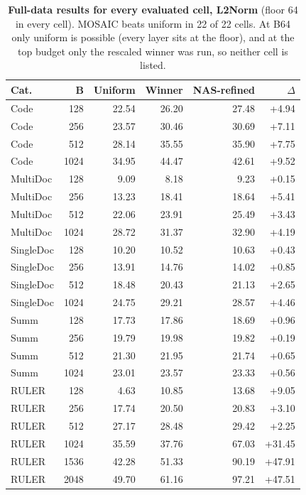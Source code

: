 \begin{table}[t]
  \centering
  \scriptsize
  \setlength{\tabcolsep}{3pt}
  \begin{tabular}{@{}l r r r r r@{}}
    \toprule
    Cat. & B & Uniform & Winner & NAS-refined & $\Delta$ \\
    \midrule
    Code & 128 & 22.54 & 26.20 & 27.48 & +4.94 \\
    Code & 256 & 23.57 & 30.46 & 30.69 & +7.11 \\
    Code & 512 & 28.14 & 35.55 & 35.90 & +7.75 \\
    Code & 1024 & 34.95 & 44.47 & 42.61 & +9.52 \\
    MultiDoc & 128 & 9.09 & 8.18 & 9.23 & +0.15 \\
    MultiDoc & 256 & 13.23 & 18.41 & 18.64 & +5.41 \\
    MultiDoc & 512 & 22.06 & 23.91 & 25.49 & +3.43 \\
    MultiDoc & 1024 & 28.72 & 31.37 & 32.90 & +4.19 \\
    SingleDoc & 128 & 10.20 & 10.52 & 10.63 & +0.43 \\
    SingleDoc & 256 & 13.91 & 14.76 & 14.02 & +0.85 \\
    SingleDoc & 512 & 18.48 & 20.43 & 21.13 & +2.65 \\
    SingleDoc & 1024 & 24.75 & 29.21 & 28.57 & +4.46 \\
    Summ & 128 & 17.73 & 17.86 & 18.69 & +0.96 \\
    Summ & 256 & 19.79 & 19.98 & 19.82 & +0.19 \\
    Summ & 512 & 21.30 & 21.95 & 21.74 & +0.65 \\
    Summ & 1024 & 23.01 & 23.57 & 23.33 & +0.56 \\
    RULER & 128 & 4.63 & 10.85 & 13.68 & +9.05 \\
    RULER & 256 & 17.74 & 20.50 & 20.83 & +3.10 \\
    RULER & 512 & 27.17 & 28.48 & 29.42 & +2.25 \\
    RULER & 1024 & 35.59 & 37.76 & 67.03 & +31.45 \\
    RULER & 1536 & 42.28 & 51.33 & 90.19 & +47.91 \\
    RULER & 2048 & 49.70 & 61.16 & 97.21 & +47.51 \\
    \bottomrule
  \end{tabular}
  \caption{\textbf{Full-data results for every evaluated cell, L2Norm} (floor 64 in every cell). MOSAIC beats uniform in 22 of 22 cells. At B64 only uniform is possible (every layer sits at the floor), and at the top budget only the rescaled winner was run, so neither cell is listed.}
  \label{tab:app-cells-l2norm}
\end{table}


